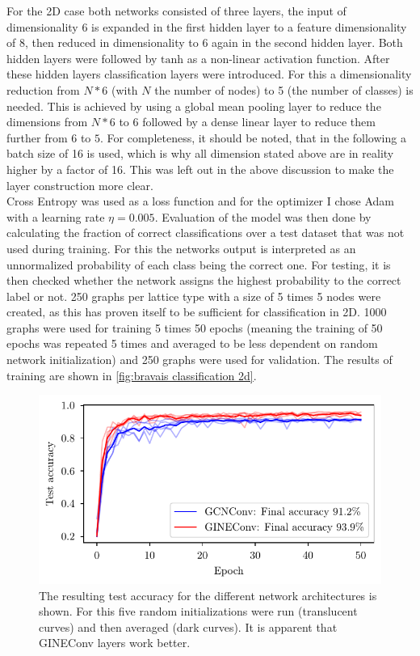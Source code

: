 \documentclass[11pt,a4paper]{article}
\begin{document}
For the 2D case both networks consisted of three layers, the input of dimensionality 6 is expanded in the first hidden layer to a feature dimensionality of 8, then reduced in dimensionality to 6 again in the second hidden layer. 
Both hidden layers were followed by $\mathrm{tanh}$ as a non-linear activation function. 
After these hidden layers classification layers were introduced. 
For this a dimensionality reduction from $N * 6$ (with $N$ the number of nodes) to 5 (the number of classes) is needed. 
This is achieved by using a global mean pooling layer to reduce the dimensions from $N * 6$ to $6$ followed by a dense linear layer to reduce them further from $6$ to $5$. 
For completeness, it should be noted, that in the following a batch size of 16 is used, which is why all dimension stated above are in reality higher by a factor of 16. 
This was left out in the above discussion to make the layer construction more clear. \\
Cross Entropy was used as a loss function and for the optimizer I chose Adam with a learning rate $\eta=0.005$. 
Evaluation of the model was then done by calculating the fraction of correct classifications over a test dataset that was not used during training. 
For this the networks output is interpreted as an unnormalized probability of each class being the correct one. 
For testing, it is then checked whether the network assigns the highest probability to the correct label or not. 
250 graphs per lattice type with a size of 5 times 5 nodes were created, as this has proven itself to be sufficient for classification in 2D. 
1000 graphs were used for training 5 times 50 epochs (meaning the training of 50 epochs was repeated 5 times and averaged to be less dependent on random network initialization) and 250 graphs were used for validation. 
The results of training are shown in \autoref{fig:bravais classification 2d}. 
\begin{figure}[htbp]
    \centering
    \includegraphics{images/plots/2d_classifier_results.pdf}
    \caption{The resulting test accuracy for the different network architectures is shown. For this five random initializations were run (translucent curves) and then averaged (dark curves). It is apparent that GINEConv layers work better. }
    \label{fig:bravais classification 2d}
\end{figure}
\end{document}
